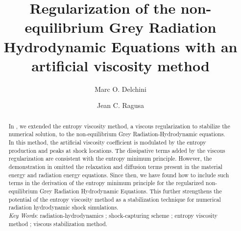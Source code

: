 \documentclass{mc2015}
\begin{document}
\title{Regularization of the non-equilibrium Grey Radiation Hydrodynamic Equations with an artificial viscosity method}

\author{Marc O. Delchini}
\author{Jean C. Ragusa}



\maketitle

\begin{abstract}
In \cite{our_jcp_radhy_paper}, we extended the entropy viscosity method, a viscous regularization to stabilize the numerical solution, 
to the non-equilibrium Grey Radiation-Hydrodynamic equations. 
In this method, the artificial viscosity coefficient is modulated by the entropy production and peaks at shock locations. 
The dissipative terms added by the viscous regularization are consistent with the entropy minimum principle. 
However, the demonstration in \cite{our_jcp_radhy_paper} omitted the relaxation and diffusion terms 
present in the material energy and radiation energy equations. Since then, we have found how to include such terms 
in the derivation of the entropy minimum principle for the regularized non-equilibrium Grey Radiation Hydrodynamic Equations. 
This further strengthens the potential of the entropy viscosity method as a stabilization technique for numerical radiation 
hydrodynamic shock simulations.
\\
%
\emph{Key Words}: radiation-hydrodynamics ; shock-capturing scheme ; entropy viscosity method ; viscous stabilization method.
\end{abstract}

\end{document}
